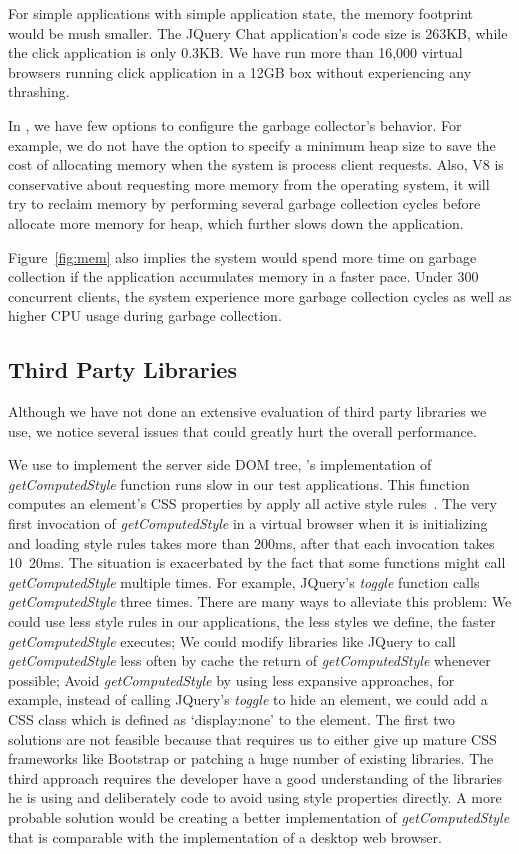 For simple applications with simple application state, the memory footprint would be mush smaller.
The JQuery Chat application's code size is 263KB, while the click application is only 0.3KB.
We have run more than 16,000 virtual browsers running click application in a 12GB box without
experiencing any thrashing.

In \nodejs{}, we have few options to configure the garbage collector's behavior.
For example, we do not have the option to specify a minimum heap size to save
the cost of allocating memory when the system is process client requests.
Also, V8 is conservative about requesting more memory from the operating system, %
it will try to reclaim memory by performing several garbage collection cycles before 
allocate more memory for heap, %
which further slows down the application.

Figure~\ref{fig:mem} also implies the system would spend more time on garbage collection if
the application accumulates memory in a faster pace.
Under 300 concurrent clients, the system experience more garbage collection cycles as
well as higher CPU usage during garbage collection.


\subsection{Third Party Libraries}
Although we have not done an extensive evaluation of third party libraries we use,
we notice several issues that could greatly hurt the overall performance.

We use \jsdom{} to implement the server side DOM tree,
\jsdom{}'s implementation of \emph{getComputedStyle} function runs slow in our test applications.
This function computes an element's CSS properties by apply all active style rules~\cite{wilson2000document}.
The very first invocation of \emph{getComputedStyle} in a virtual browser when it
is initializing and loading style rules takes more than 200ms, 
after that each invocation takes 10~20ms.
The situation is exacerbated by the fact that some functions might call \emph{getComputedStyle}
multiple times.
For example, JQuery's \emph{toggle} function calls \emph{getComputedStyle} three times.
There are many ways to alleviate this problem:
We could use less style rules in our applications, the less styles we define,
the faster \emph{getComputedStyle} executes;
We could modify libraries like JQuery to call \emph{getComputedStyle} less often
by cache the return of \emph{getComputedStyle} whenever possible;
Avoid \emph{getComputedStyle} by using less expansive approaches, for example,
instead of calling JQuery's \emph{toggle} to hide an element, 
we could add a CSS class which is defined as `display:none' to the element.
The first two solutions are not feasible because that requires us to either give up
mature CSS frameworks like Bootstrap or patching a huge number of existing \js{} libraries.
The third approach requires the developer have a good understanding of the libraries
he is using and deliberately code to avoid using style properties directly.
A more probable solution would be creating a better implementation of \emph{getComputedStyle} 
that is comparable with the implementation of a desktop web browser.

